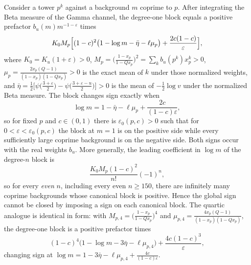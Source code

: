\documentclass[11pt]{amsart}
\theoremstyle{definition}
\theoremstyle{remark}
\theoremstyle{definition}
\newcommand{\eps}{\varepsilon}
\begin{document}
\noindent Consider a tower $p^k$ against a background $m$ coprime to $p$. After integrating the
Beta measure of the Gamma channel, the degree-one block equals a positive prefactor
$b_u(m)m^{-1-\eps}$ times
\begin{equation}\label{eq:block-1}
   K_0M_p\Bigl[(1-c)^2\bigl(1-\log m-\bar\eta-\ell\mu_p\bigr)+\frac{2c(1-c)}{\eps}\Bigr],
\end{equation}
where $K_0=K_u(1+\eps)>0$, $M_p=\bigl(\tfrac{1-x_p}{1-Qx_p}\bigr)^2=\sum_kb_u(p^k)x_p^k>0$,
$\mu_p=\tfrac{2x_p(Q-1)}{(1-x_p)(1-Qx_p)}>0$ is the exact mean of $k$ under those normalized
weights, and
$\bar\eta=\tfrac12\bigl[\psi\bigl(\tfrac{3+\eps}{2}\bigr)-\psi\bigl(\tfrac{3+\eps-u}{2}\bigr)\bigr]>0$
is the mean of $-\tfrac12\log v$ under the normalized Beta measure. The block changes sign exactly
when
\begin{equation}\label{eq:threshold-m}
   \log m=1-\bar\eta-\ell\mu_p+\frac{2c}{(1-c)\eps} ,
\end{equation}
so for fixed $p$ and $c\in(0,1)$ there is $\eps_0(p,c)>0$ such that for
$0<\eps<\eps_0(p,c)$ the block at $m=1$ is on the positive side while every sufficiently large
coprime background is on the negative side. Both signs occur with the real weights $b_u$. More
generally, the leading coefficient in $\log m$ of the degree-$n$ block is
\begin{equation}\label{eq:leading-n}
   \frac{K_0M_p(1-c)^2}{n!}(-1)^n ,
\end{equation}
so for every \emph{even} $n$, including every even $n\ge150$, there are infinitely many coprime
backgrounds whose canonical block is positive. Hence the global sign cannot be closed by imposing
a sign on each canonical block. The quartic analogue is identical in form: with
$M_{p,4}=\bigl(\tfrac{1-x_p}{1-Qx_p}\bigr)^4$ and
$\mu_{p,4}=\tfrac{4x_p(Q-1)}{(1-x_p)(1-Qx_p)}$, the degree-one block is a positive prefactor
times
\begin{equation}\label{eq:block-4}
   (1-c)^4\bigl(1-\log m-3\bar\eta-\ell\mu_{p,4}\bigr)+\frac{4c(1-c)^3}{\eps},
\end{equation}
changing sign at $\log m=1-3\bar\eta-\ell\mu_{p,4}+\tfrac{4c}{(1-c)\eps}$.
\end{document}
